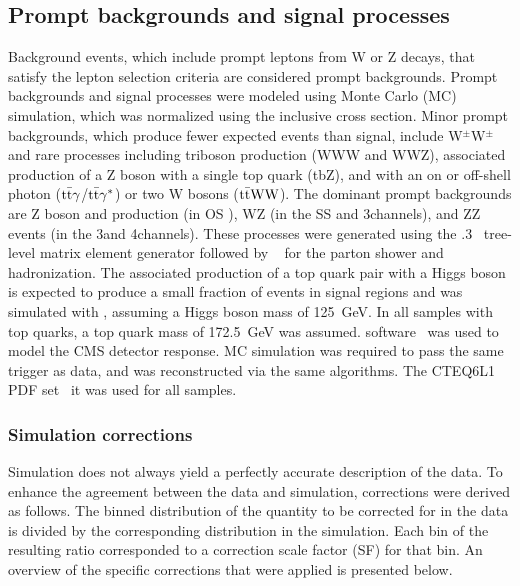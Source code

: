 \subsection{Prompt backgrounds and signal processes}
Background events, which include prompt leptons from W or Z decays, that satisfy
the lepton selection criteria are considered prompt backgrounds. Prompt
backgrounds and signal processes were modeled using Monte Carlo (MC) simulation,
which was normalized using the inclusive cross section. Minor prompt backgrounds,
which produce fewer expected events than signal, include W$^{\pm}$W$^{\pm}$ and
rare processes including triboson production (WWW and WWZ), associated
production of a Z boson with a single top quark (tbZ), and \ttbar with an on or
off-shell photon ($\text{t}\bar{\text{t}}\gamma$/$\text{t}\bar{\text{t}}\gamma^{*}$) or two W bosons
($\text{t}\bar{\text{t}}\text{W}\text{W}$). The dominant prompt backgrounds are Z boson and \ttbar
production (in OS \ttZ), WZ (in the SS \ttW and 3\lep channels), and ZZ events
(in the 3\lep and 4\lep channels). These processes were generated using the
.3~\cite{MADGRAPH5} tree-level matrix element generator followed by
~\cite{PYTHIA} for the parton shower and hadronization. The
associated production of a top quark pair with a Higgs boson is expected to
produce a small fraction of events in signal regions and was simulated with
\pythia, assuming a Higgs boson mass of \SI{125}{GeV}. In all samples with top
quarks, a top quark mass of \SI{172.5}{GeV} was assumed. \geant
software~\cite{Agostinelli:2002hh} was used to model the CMS detector response.
MC simulation was required to pass the same trigger as data, and was reconstructed
via the same algorithms. The CTEQ6L1 PDF set~\cite{Pumplin:2002vw} it was used for
all samples.

\subsubsection{Simulation corrections}
Simulation does not always yield a perfectly accurate description of the data.
To enhance the agreement between the data and simulation, corrections were derived
as follows. The binned distribution of the quantity to be corrected for in the data
is divided by the corresponding distribution in the simulation. Each bin of the
resulting ratio corresponded to a correction scale factor (SF) for that bin. An
overview of the specific corrections that were applied is presented below.

